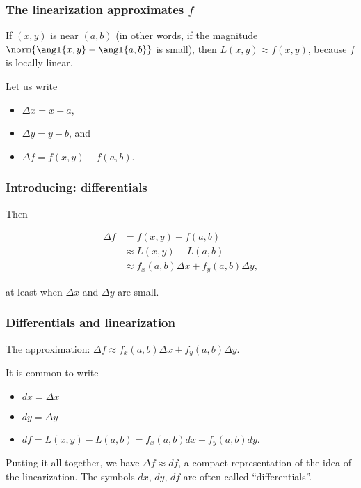\documentclass[11pt,ignorenonframetext,aspectratio=169,xcolor={svgnames}]{beamer}
\begin{document}
\begin{frame}\frametitle{The linearization approximates $f$}

If $(x,y)$ is near $(a,b)$ (in other words, if the magnitude
$\norm{\angl{x,y} - \angl{a,b}}$ is small), then
$L(x,y) \approx f(x,y)$, because $f$ is locally linear.

Let us write

\begin{itemize}[<+->]

\item
  $\Delta x = x - a$,
\item
  $\Delta y = y - b$, and
\item
  $\Delta f = f(x,y) - f(a,b)$.
\end{itemize}

\end{frame}

\begin{frame}\frametitle{Introducing: differentials}

Then

\begin{align*}
\Delta f &= f(x,y) - f(a,b) \\
         & \approx L(x,y) - L(a, b) \\
         & \approx f_x(a,b)\Delta x + f_y(a,b) \Delta y, 
\end{align*}

at least when $\Delta x$ and $\Delta y$ are small.

\end{frame}

\begin{frame}\frametitle{Differentials and linearization}

The approximation:
$\Delta f \approx f_x(a,b) \Delta x + f_y(a,b) \Delta y$.

It is common to write

\begin{itemize}

\item
  $dx = \Delta x$
\item
  $dy = \Delta y$
\item
  $df = L(x,y) - L(a,b) = f_x(a,b) dx + f_y(a,b) dy$.
\end{itemize}

Putting it all together, we have $\Delta f \approx df$, a compact
representation of the idea of the linearization. The symbols $dx$, $dy$,
$df$ are often called ``differentials''.

\end{frame}
\end{document}
